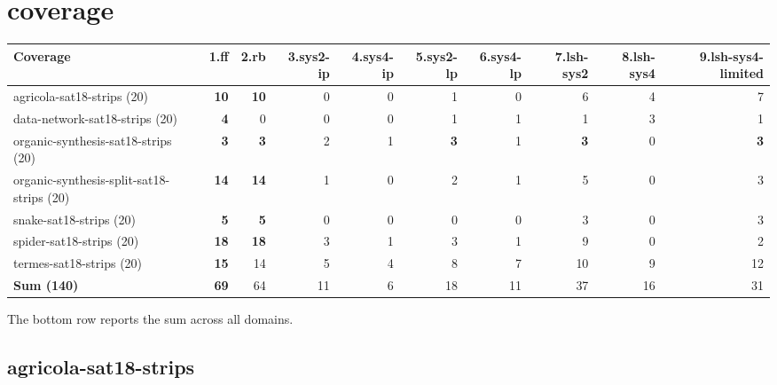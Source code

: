 \documentclass{article}
\newcommand{\numtasks}[1]{\small{(#1)}}
\begin{document}
\hypertarget{coverage}{}
\section*{coverage}

\begin{tabular}{@{}lrrrrrrrrr@{}}
Coverage & 1.ff & 2.rb & 3.sys2-ip & 4.sys4-ip & 5.sys2-lp & 6.sys4-lp & 7.lsh-sys2 & 8.lsh-sys4 & 9.lsh-sys4-limited \\
\midrule
agricola-sat18-strips \numtasks{20} & \textbf{10} & \textbf{10} & 0 & 0 & 1 & 0 & 6 & 4 & 7 \\
data-network-sat18-strips \numtasks{20} & \textbf{4} & 0 & 0 & 0 & 1 & 1 & 1 & 3 & 1 \\
organic-synthesis-sat18-strips \numtasks{20} & \textbf{3} & \textbf{3} & 2 & 1 & \textbf{3} & 1 & \textbf{3} & 0 & \textbf{3} \\
organic-synthesis-split-sat18-strips \numtasks{20} & \textbf{14} & \textbf{14} & 1 & 0 & 2 & 1 & 5 & 0 & 3 \\
snake-sat18-strips \numtasks{20} & \textbf{5} & \textbf{5} & 0 & 0 & 0 & 0 & 3 & 0 & 3 \\
spider-sat18-strips \numtasks{20} & \textbf{18} & \textbf{18} & 3 & 1 & 3 & 1 & 9 & 0 & 2 \\
termes-sat18-strips \numtasks{20} & \textbf{15} & 14 & 5 & 4 & 8 & 7 & 10 & 9 & 12 \\
\textbf{Sum \numtasks{140}} & \textbf{69} & 64 & 11 & 6 & 18 & 11 & 37 & 16 & 31 \\
\end{tabular}

The bottom row reports the sum across all domains.

\hypertarget{coverage-agricola-sat18-strips}{}
\subsection*{agricola-sat18-strips}
\end{document}
